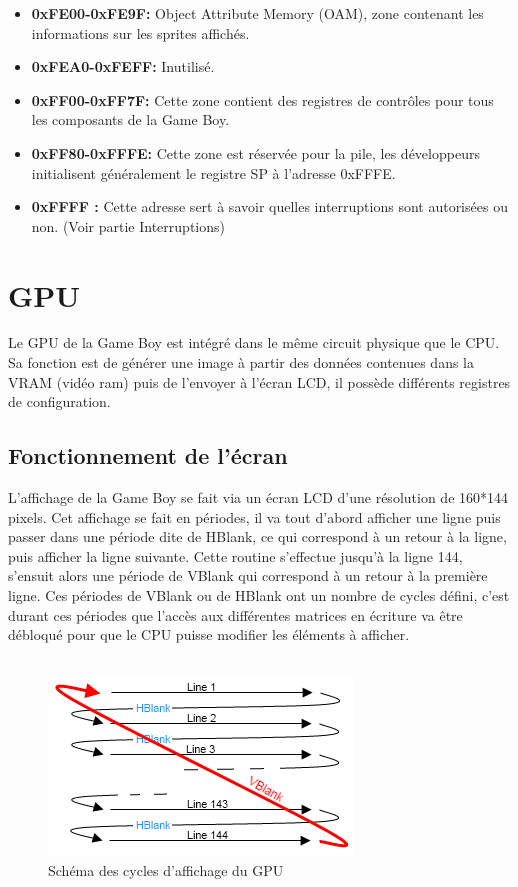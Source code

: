 \documentclass{report}
\begin{document}
\begin{itemize}
\item \textbf{0xFE00-0xFE9F:} Object Attribute Memory (OAM), zone contenant les informations
sur les sprites affichés.
\item \textbf{0xFEA0-0xFEFF:} Inutilisé.
\item \textbf{0xFF00-0xFF7F:} Cette zone contient des registres de contrôles pour tous les composants de la
Game Boy.
\item \textbf{0xFF80-0xFFFE:} Cette zone est réservée pour la pile, les
développeurs initialisent généralement le registre SP à l'adresse 0xFFFE.
\item \textbf{0xFFFF :} Cette adresse sert à savoir quelles interruptions sont autorisées ou
non. (Voir partie Interruptions)
\end{itemize} 


\section{GPU}

Le GPU de la Game Boy est intégré dans le même circuit physique que le CPU. Sa fonction est de générer une image à partir des données contenues dans la \gls{VRAM} (vidéo ram) puis de l'envoyer à l'écran LCD, il possède différents registres de configuration.

\subsection{Fonctionnement de l'écran}

L'affichage de la Game Boy se fait via un écran LCD d'une résolution de 160*144 pixels. Cet affichage se fait en périodes, il va tout d'abord afficher une ligne puis passer dans une période dite de HBlank, ce qui correspond à un retour à la ligne, puis afficher la ligne suivante. Cette routine s'effectue jusqu'à la ligne 144, s'ensuit alors une période de VBlank qui correspond à un retour à la première ligne.
Ces périodes de VBlank ou de HBlank ont un nombre de cycles défini, c'est
durant ces périodes que l'accès aux différentes matrices en écriture va être
débloqué pour que le CPU puisse modifier les éléments à afficher.\\\\

\begin{figure}[!h]
\centering
\includegraphics[scale=0.8]{images/gpu_cycles.png}
\caption{Schéma des cycles d'affichage du GPU}
\label{gpucycles}
\end{figure}
\end{document}
